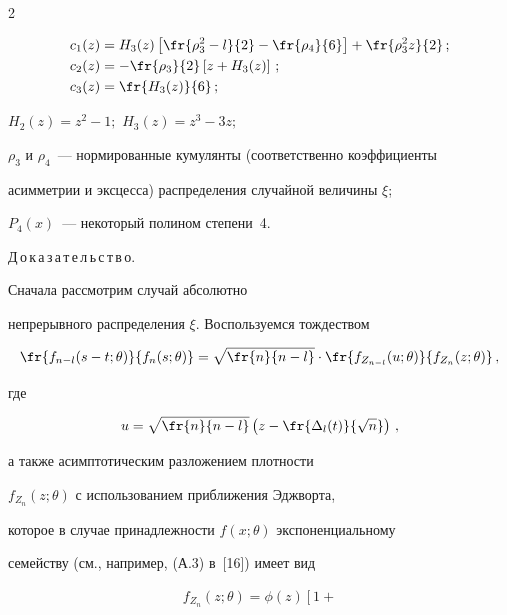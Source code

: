 \begin{multicols}{2}
{\begin{align*}
c_1(z)&=H_3(z)\left[\fr{\rho_3^2-l}{2}- \fr{\rho_4}{6}\right]+


             \fr{\rho_3^2 z}{2}\,;\\


 c_2(z)&=-\fr{\rho_3}{2}\left[ z+H_3(z)\right]\,;\\


 c_3(z)&=\fr{H_3(z)}{6}\,;


\end{align*}


  $H_2(z)=z^2-1;$ $H_3(z)=z^3-3z;$\


  $\rho_3$ и $\rho_4$~--- нормированные кумулянты (соответственно коэффициенты


  асимметрии и эксцесса) распределения случайной величины $\xi$;


  $P_4(x)$~--- некоторый полином степени~4.}





\smallskip


\noindent


Д\,о\,к\,а\,з\,а\,т\,е\,л\,ь\,с\,т\,в\,о. 


Сначала рассмотрим случай абсолютно


непрерывного распределения $\xi$. Воспользуемся тождеством


  \begin{equation} 


\fr{f_{n-l}(s-t;\theta)}{f_n(s;\theta)}=\sqrt{\fr{n}{n-l}}


     \cdot \fr{f_{Z_{n-l}}(u;\theta)}{f_{Z_n}(z;\theta)}\,,


\label{e13c}


\end{equation}


где 


$$


u=\sqrt{\fr{n}{n-l}} \left(z-\fr{\Delta_l(t)}{\sqrt{n}} \right)\,,


$$


а также асимптотическим разложением плотности


 $f_{Z_n}(z;\theta)$ с использованием приближения Эджворта,


 которое в случае принадлежности $f(x;\theta)$ экспоненциальному


  семейству (см., например, (А.3) в~[16]) имеет вид


  \begin{multline*}    


f_{Z_n}(z;\theta)=\phi(z)\left[1+



\end{multline*}
\end{multicols}
